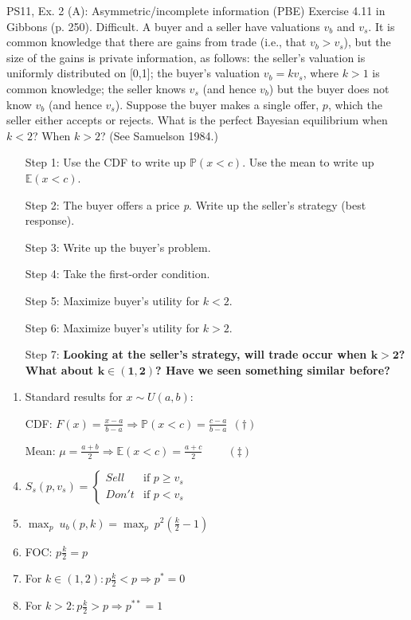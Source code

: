 \begin{frame}{PS11, Ex. 2 (A): Asymmetric/incomplete information (PBE)}
    Exercise 4.11 in Gibbons (p. 250). Difficult. A buyer and a seller have valuations $v_b$ and $v_s$. It is common knowledge that there are gains from trade (i.e., that $v_b > v_s$), but the size of the gains is private information, as follows: the seller’s valuation is uniformly distributed on [0,1]; the buyer’s valuation $v_b = kv_s$, where $k > 1$ is common knowledge; the seller knows $v_s$ (and hence $v_b$) but the buyer does not know $v_b$ (and hence $v_s$). Suppose the buyer makes a single offer, $p$, which the seller either accepts or rejects. What is the perfect Bayesian equilibrium when $k < 2$? When $k > 2$? (See Samuelson 1984.) \vspace{-8pt}
    \begin{multicols}{2}
      \begin{itemize}
        \item[Step 1:] Use the CDF to write up $\mathbb{P}(x<c)$. Use the mean to write up $\mathbb{E}(x<c)$.
        \item[Step 2:] The buyer offers a price \textit{p}. Write up the seller's strategy (best response).
        \item[Step 3:] Write up the buyer's problem.
        \item[Step 4:] Take the first-order condition.
        \item[Step 5:] Maximize buyer's utility for $k<2$.
        \item[Step 6:] Maximize buyer's utility for $k>2$.
        \item[Step 7:] \textbf{Looking at the seller's strategy, will trade occur when $\bm{k>2}$?\\
        What about $\bm{k\in(1,2)}$? Have we seen something similar before?}
      \end{itemize}
      \vfill\null\columnbreak
      \begin{enumerate}
        \item Standard results for $x\sim U(a, b):$
        \item[CDF:] $F(x)=\frac{x-a}{b-a}\Rightarrow\mathbb{P}(x<c)=\frac{c-a}{b-a}\ \ (\dagger)$
        \item[Mean:] $\mu=\frac{a+b}{2}\Rightarrow\mathbb{E}(x<c)=\frac{a+c}{2}\quad\quad\ (\ddagger)$
        \item $S_s(p,v_s)=\left\{\begin{array}{ll}
          Sell  & \text{if }p\geq v_s \\
          Don't & \text{if }p < v_s
        \end{array}\right.$
        \item $\displaystyle{\max_p}\ u_b(p,k)=\displaystyle{\max_p}\ p^2\left(\frac{k}{2}-1\right)$
        \item FOC: $p\frac{k}{2}=p$
        \item For $k\in(1,2): p\frac{k}{2}<p\Rightarrow p^*=0$
        \item For $k>2: p\frac{k}{2}>p\Rightarrow p^{**}=1$
      \end{enumerate}
      \vfill\null
    \end{multicols}
\end{frame}
